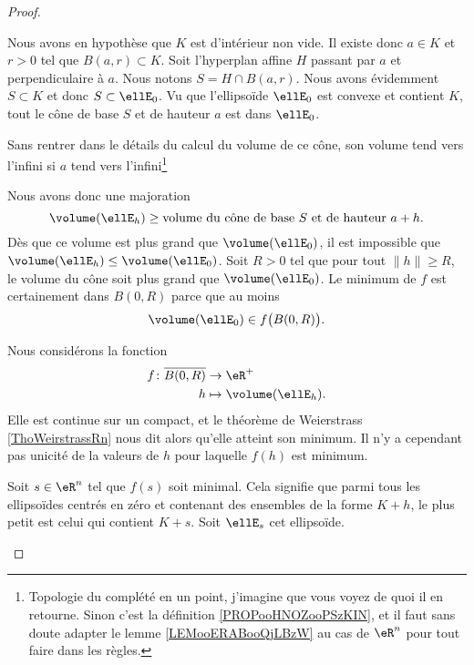 \begin{proof}
\begin{subproof}
		\spitem[Compact]

		Nous avons en hypothèse que \( K\) est d'intérieur non vide. Il existe donc \( a\in K\) et \( r>0\) tel que \( B(a,r)\subset K\). Soit l'hyperplan affine \( H\) passant par \( a\) et perpendiculaire à \( a\). Nous notons \( S=H\cap B(a,r)\). Nous avons évidemment \( S\subset K\) et donc \( S\subset \ellE_0\). Vu que l'ellipsoïde \( \ellE_0\) est convexe et contient \( K\), tout le cône de base \( S\) et de hauteur \( a\) est dans \( \ellE_0\).

		Sans rentrer dans le détails du calcul du volume de ce cône, son volume tend vers l'infini si \( a\) tend vers l'infini\footnote{Topologie du complété en un point, j'imagine que vous voyez de quoi il en retourne. Sinon c'est la définition \ref{PROPooHNOZooPSzKIN}, et il faut sans doute adapter le lemme \ref{LEMooERABooQjLBzW} au cas de \( \eR^n\) pour tout faire dans les règles.}

		Nous avons donc une majoration
		\begin{equation}
			\volume(\ellE_h)\geq \text{volume du cône de base } S\text{ et de hauteur } a+h.
		\end{equation}
		Dès que ce volume est plus grand que \( \volume(\ellE_0)\), il est impossible que \( \volume(\ellE_h)\leq \volume(\ellE_0)\). Soit \( R>0\) tel que pour tout \( \| h \|\geq R\), le volume du cône soit plus grand que \( \volume(\ellE_0)\). Le minimum de \( f\) est certainement dans \( B(0,R)\) parce que au moins
		\begin{equation}
			\volume(\ellE_0)\in f\big( B(0,R) \big).
		\end{equation}

		\spitem[Minimum]

		Nous considérons la fonction
		\begin{equation}
			\begin{aligned}
				f\colon \overline{ B(0,R) } & \to \eR^+                 \\
				h                           & \mapsto \volume(\ellE_h).
			\end{aligned}
		\end{equation}
		Elle est continue sur un compact, et le théorème de Weierstrass \ref{ThoWeirstrassRn} nous dit alors qu'elle atteint son minimum. Il n'y a cependant pas unicité de la valeurs de \( h\) pour laquelle \( f(h)\) est minimum.

		\spitem[Envoi]

		Soit \( s\in \eR^n\) tel que \( f(s)\) soit minimal. Cela signifie que parmi tous les ellipsoïdes centrés en zéro et contenant des ensembles de la forme \( K+h\), le plus petit est celui qui contient \( K+s\). Soit \( \ellE_s\) cet ellipsoïde.


\end{subproof}
\end{proof}
